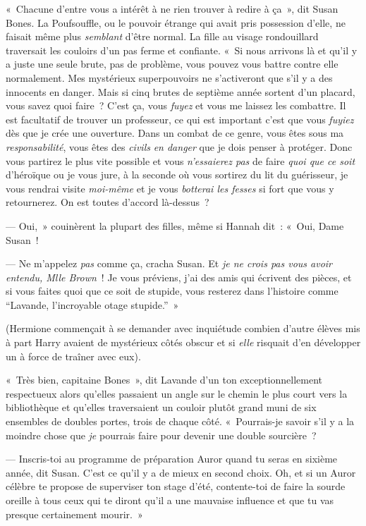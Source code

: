 «~Chacune d'entre vous a intérêt à ne rien trouver à redire à ça~», dit Susan Bones. La Poufsouffle, ou le pouvoir étrange qui avait pris possession d'elle, ne faisait même plus \emph{semblant} d'être normal. La fille au visage rondouillard traversait les couloirs d'un pas ferme et confiante. «~Si nous arrivons là et qu'il y a juste une seule brute, pas de problème, vous pouvez vous battre contre elle normalement. Mes mystérieux superpouvoirs ne s'activeront que s'il y a des innocents en danger. Mais si cinq brutes de septième année sortent d'un placard, vous savez quoi faire~? C'est ça, vous \emph{fuyez} et vous me laissez les combattre. Il est facultatif de trouver un professeur, ce qui est important c'est que vous \emph{fuyiez} dès que je crée une ouverture. Dans un combat de ce genre, vous êtes sous ma \emph{responsabilité}, vous êtes des \emph{civils} \emph{en danger} que je dois penser à protéger. Donc vous partirez le plus vite possible et vous \emph{n'essaierez pas} de faire \emph{quoi que ce soit} d'héroïque ou je vous jure, à la seconde où vous sortirez du lit du guérisseur, je vous rendrai visite \emph{moi-même} et je vous \emph{botterai les fesses} si fort que vous y retournerez. On est toutes d'accord là-dessus~?

--- Oui,~» couinèrent la plupart des filles, même si Hannah dit~: «~Oui, Dame Susan~!

--- Ne m'appelez \emph{pas} comme ça, cracha Susan. Et \emph{je ne crois pas vous avoir entendu, Mlle Brown}~! Je vous préviens, j'ai des amis qui écrivent des pièces, et si vous faites quoi que ce soit de stupide, vous resterez dans l'histoire comme “Lavande, l'incroyable otage stupide.”~»

(Hermione commençait à se demander avec inquiétude combien d'autre élèves mis à part Harry avaient de mystérieux côtés obscur et si \emph{elle} risquait d'en développer un à force de traîner avec eux).

«~Très bien, capitaine Bones~», dit Lavande d'un ton exceptionnellement respectueux alors qu'elles passaient un angle sur le chemin le plus court vers la bibliothèque et qu'elles traversaient un couloir plutôt grand muni de six ensembles de doubles portes, trois de chaque côté. «~Pourrais-je savoir s'il y a la moindre chose que \emph{je} pourrais faire pour devenir une double sourcière~?

--- Inscris-toi au programme de préparation Auror quand tu seras en sixième année, dit Susan. C'est ce qu'il y a de mieux en second choix. Oh, et si un Auror célèbre te propose de superviser ton stage d'été, contente-toi de faire la sourde oreille à tous ceux qui te diront qu'il a une mauvaise influence et que tu vas presque certainement mourir.~»

